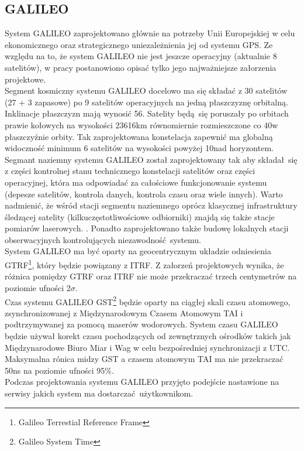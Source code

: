 	\subsection{GALILEO}
System GALILEO zaprojektowano głównie na potrzeby Unii Europejskiej w celu ekonomicznego oraz strategicznego uniezależnienia jej od systemu GPS.
Ze względu na to, że system GALILEO nie jest jeszcze operacyjny (aktualnie 8 satelitów), w pracy postanowiono opisać tylko jego najważniejsze załorzenia projektowe.\\
\indent Segment kosmiczny systemu GALILEO docelowo ma się składać z 30 satelitów (27 + 3 zapasowe) po 9 satelitów operacyjnych na jedną płaszczyznę orbitalną.
Inklinacje płaszczyzn mają wynosić 56\degree. Satelity będą się poruszały po orbitach prawie kołowych na wysokości 23616km równomiernie rozmieszczone co 40\degree w 
płaszczyźnie orbity. Tak zaprojektowana konstelacja zapewnić ma globalną widoczność minimum 6 satelitów na wysokości powyżej 10\degree nad horyzontem.\\
\indent Segmant naziemny systemu GALILEO został zaprojektowany tak aby składał się z części kontrolnej stanu technicznego konstelacji satelitów oraz 
części operacyjnej, która ma odpowiadać za całościowe funkcjonowanie systemu (depesze satelitów, kontrola danych, kontrola czasu oraz wiele innych). Warto nadmienić,
że wśród stacji segmentu naziemnego oprócz klasycznej infrastruktury śledzącej satelity (kilkuczęstotliwościowe odbiorniki) znajdą się także stacje pomiarów laserowych.
\cite[][strona 380]{hofmann_gnss}. Ponadto zaprojektowano także budowę lokalnych stacji obserwacyjnych kontrolujących niezawodność systemu.\\
\indent System GALILEO ma być oparty na geocentrycznym układzie odniesienia GTRF\footnote{Galileo Terrestial Reference Frame}, który będzie powiązany z ITRF.
Z załorzeń projektowych wynika, że różnica pomiędzy GTRF oraz ITRF nie może przekraczać trzech centymetrów na poziomie ufności 2$\sigma$.\\
\indent Czas systemu GALILEO GST\footnote{Galileo System Time} będzie oparty na ciągłej skali czasu atomowego, zsynchronizowanej z Międzynarodowym Czasem Atomowym TAI i
podtrzymywanej za pomocą maserów wodorowych. System czasu GALILEO będzie używał korekt czasu pochodzących od zewnętrznych ośrodków takich jak Międzynarodowe 
Biuro Miar i Wag w celu bezpośredniej synchronizacji z UTC. Maksymalna rónica midzy GST a czasem atomowym TAI ma nie przekraczać 50ns na poziomie ufności 95\%.\\
\indent Podczas projektowania systemu GALILEO przyjęto podejście nastawione na serwisy jakich system ma dostarczać użytkownikom.
